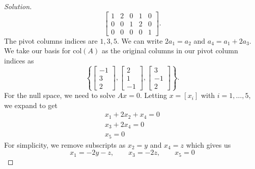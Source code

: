 \documentclass[12pt]{amsart}
\newenvironment{solution}
{\begin{proof}[Solution]}
{\end{proof}}
\begin{document}
\begin{onehalfspace}
\begin{solution}
            \begin{displaymath}
                \left[\begin{matrix}
                          1 & 2 & 0 & 1 & 0\\
                          0 & 0 & 1 & 2 & 0\\
                          0 & 0 & 0 & 0 & 1
                \end{matrix}\right].
            \end{displaymath}
            The pivot columns indices are $1,3,5$.
            We can write $2a_1=a_2$ and $a_4=a_1 + 2a_3$.
            We take our basis for $\text{col}(A)$ as the original columns in our pivot
            column indices as
            \begin{displaymath}
                \left\{
                    \left[\begin{matrix}
                              -1\\
                              3\\
                              2
                    \end{matrix}\right],
                    \left[\begin{matrix}
                              2\\
                              1\\
                              -1
                    \end{matrix}\right],
                    \left[\begin{matrix}
                              3\\
                              -1\\
                              2
                    \end{matrix}\right]
                \right\}.
            \end{displaymath}
            For the null space, we need to solve $Ax=0$.
            Letting $x=[x_i]$ with $i =1,\ldots,5$, we expand to get
            \begin{gather*}
                x_1 + 2x_2+x_4 = 0\\
                x_3 + 2x_4 = 0\\
                x_5 = 0
            \end{gather*}
            For simplicity, we remove subscripts as $x_2=y$ and $x_4=z$ which gives us
            \begin{displaymath}
                x_1 = -2y-z,\qquad x_3=-2z,\qquad x_5=0

\end{displaymath}
\end{solution}
\end{onehalfspace}
\end{document}
